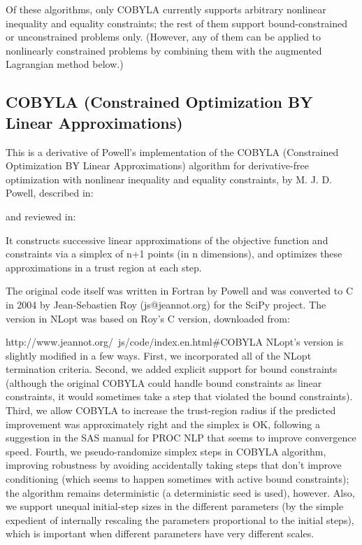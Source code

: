 Of these algorithms, only COBYLA currently supports arbitrary nonlinear inequality and equality constraints; the rest of them support bound-constrained or unconstrained problems only. (However, any of them can be applied to nonlinearly constrained problems by combining them with the augmented Lagrangian method below.) 


\subsection{COBYLA (Constrained Optimization BY Linear Approximations)}
This is a derivative of Powell's implementation of the COBYLA (Constrained Optimization BY Linear Approximations) algorithm for derivative-free optimization with nonlinear inequality and equality constraints, by M. J. D. Powell, described in: \cite{Powell_1994}


and reviewed in: \cite{Powell_1998}


It constructs successive linear approximations of the objective function and constraints via a simplex of n+1 points (in n dimensions), and optimizes these approximations in a trust region at each step. 

The original code itself was written in Fortran by Powell and was converted to C in 2004 by Jean-Sebastien Roy (js@jeannot.org) for the SciPy project. The version in NLopt was based on Roy's C version, downloaded from: 

http://www.jeannot.org/~js/code/index.en.html\#COBYLA 
NLopt's version is slightly modified in a few ways. First, we incorporated all of the NLopt termination criteria. Second, we added explicit support for bound constraints (although the original COBYLA could handle bound constraints as linear constraints, it would sometimes take a step that violated the bound constraints). Third, we allow COBYLA to increase the trust-region radius if the predicted improvement was approximately right and the simplex is OK, following a suggestion in the SAS manual for PROC NLP that seems to improve convergence speed. Fourth, we pseudo-randomize simplex steps in COBYLA algorithm, improving robustness by avoiding accidentally taking steps that don't improve conditioning (which seems to happen sometimes with active bound constraints); the algorithm remains deterministic (a deterministic seed is used), however. Also, we support unequal initial-step sizes in the different parameters (by the simple expedient of internally rescaling the parameters proportional to the initial steps), which is important when different parameters have very different scales. 

